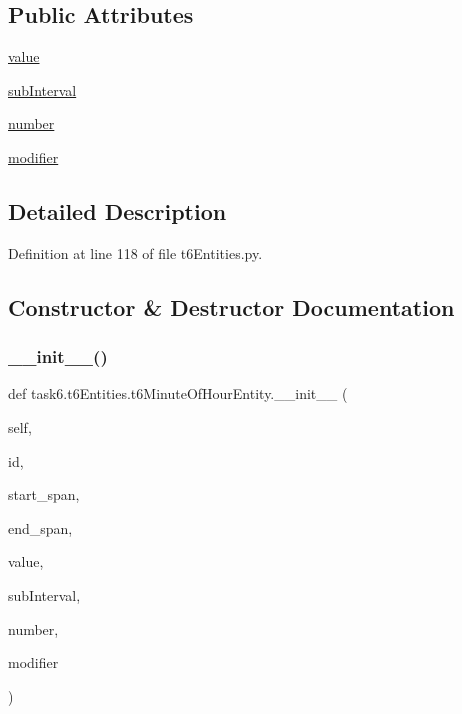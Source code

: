 \subsection*{Public Attributes}
\begin{DoxyCompactItemize}
\item 
\hyperlink{classtask6_1_1t6Entities_1_1t6MinuteOfHourEntity_a05c8f877ba7e2a14268822f4b5d44b8e}{value}
\item 
\hyperlink{classtask6_1_1t6Entities_1_1t6MinuteOfHourEntity_aaec6fa90307d3ca499db6c3d1850c473}{sub\+Interval}
\item 
\hyperlink{classtask6_1_1t6Entities_1_1t6MinuteOfHourEntity_ade30fe04589a01f2e18da1402a747d23}{number}
\item 
\hyperlink{classtask6_1_1t6Entities_1_1t6MinuteOfHourEntity_a44258f98be3f8d67ee180b919a9bc7b9}{modifier}
\end{DoxyCompactItemize}


\subsection{Detailed Description}


Definition at line 118 of file t6\+Entities.\+py.



\subsection{Constructor \& Destructor Documentation}
\mbox{\label{classtask6_1_1t6Entities_1_1t6MinuteOfHourEntity_ad5546058d02990428fa86ed2fce28813}} 
\subsubsection{\texorpdfstring{\+\_\+\+\_\+init\+\_\+\+\_\+()}{\_\_init\_\_()}}
{\footnotesize\ttfamily def task6.\+t6\+Entities.\+t6\+Minute\+Of\+Hour\+Entity.\+\_\+\+\_\+init\+\_\+\+\_\+ (\begin{DoxyParamCaption}\item[{}]{self,  }\item[{}]{id,  }\item[{}]{start\+\_\+span,  }\item[{}]{end\+\_\+span,  }\item[{}]{value,  }\item[{}]{sub\+Interval,  }\item[{}]{number,  }\item[{}]{modifier }\end{DoxyParamCaption})}



